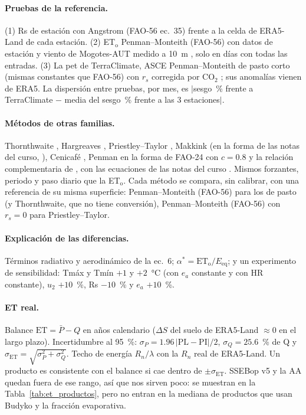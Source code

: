 \documentclass[11pt,letterpaper]{article}
\newcommand{\ETo}{ET$_\mathrm{o}$}
\newcommand{\PM}{Penman--Monteith (FAO-56)}
\begin{document}
\paragraph{Pruebas de la referencia.} (1) Rs de estación con Angstrom (FAO-56 ec.~35) frente a la celda de ERA5-Land
de cada estación. (2) \ETo{} \PM{} con datos de estación y viento de Mogotes-AUT medido a 10~m
\citep{ideam_gdim003}, solo en días con todas las entradas. (3) La pet de TerraClimate, ASCE Penman--Monteith de pasto
corto (mismas constantes que FAO-56) con $r_s$ corregida por CO$_2$ \citep{yang2019}; sus anomalías vienen de ERA5.
La dispersión entre pruebas, por mes, es $|$sesgo~\% frente a TerraClimate $-$ media del sesgo~\% frente a las 3
estaciones$|$.

\paragraph{Métodos de otras familias.} Thornthwaite \citep{thornthwaite1948}, Hargreaves \citep{hargreaves1985},
Priestley--Taylor \citep[$\alpha = 1.26$;][]{priestley1972}, Makkink (en la forma de las notas del curso, \citealp{hoyos_et}), Cenicafé
\citep{jaramillo2006}, Penman en la forma de FAO-24 con $c = 0.8$ \citep{penman1948,doorenbos1977} y la relación
complementaria de \citet{brutsaert1979}, con las ecuaciones de las notas del curso \citep{hoyos_et}. Mismos forzantes,
periodo y paso diario que la \ETo. Cada método se compara, sin calibrar, con una referencia de su misma superficie:
\PM{} para los de pasto (y Thornthwaite, que no tiene conversión), \PM{} con $r_s = 0$ para Priestley--Taylor.

\paragraph{Explicación de las diferencias.} Términos radiativo y aerodinámico de la ec.~6; $\alpha^* =
\mathrm{ET_o}/E_\mathrm{eq}$; y un experimento de sensibilidad: Tmáx y Tmín $+1$ y $+2$~°C (con $e_a$ constante y con
HR constante), $u_2$ $+10$~\%, Rs $-10$~\% y $e_a$ $+10$~\%.

\paragraph{ET real.} Balance $\mathrm{ET} = \bar{P} - Q$ en años calendario ($\Delta S$ del suelo de ERA5-Land
$\approx 0$ en el largo plazo). Incertidumbre al 95~\%: $\sigma_P = 1.96\,|\mathrm{PL}-\mathrm{PI}|/2$, $\sigma_Q =
25.6$~\% de Q \citep{dibaldassarre2009} y $\sigma_\mathrm{ET} = \sqrt{\sigma_P^2 + \sigma_Q^2}$. Techo de energía
$R_n/\lambda$ con la $R_n$ real de ERA5-Land. Un producto es consistente con el balance si cae dentro de
$\pm\sigma_\mathrm{ET}$. SSEBop v5 y la AA quedan fuera de ese rango, así que nos sirven poco: se muestran en la
Tabla~\ref{tab:et_productos}, pero no entran en la mediana de productos que usan Budyko y la fracción evaporativa.
\end{document}
